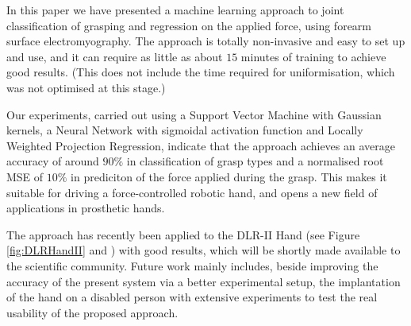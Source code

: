In this paper we have presented a machine learning approach to
joint classification of grasping and regression on the applied force,
using forearm surface electromyography. The approach is totally
non-invasive and easy to set up and use, and it can require as little
as about $15$ minutes of training to achieve good results. (This does
not include the time required for uniformisation, which was not
optimised at this stage.)

Our experiments, carried out using a Support Vector Machine with
Gaussian kernels, a Neural Network with sigmoidal activation
function and Locally Weighted Projection Regression, indicate that
the approach achieves an average accuracy of around $90\%$ in
classification of grasp types and a normalised root MSE of $10\%$
in prediciton of the force applied during the grasp. This makes it
suitable for driving a force-controlled robotic hand, and opens a
new field of applications in prosthetic hands.

The approach has recently been applied to the DLR-II Hand (see Figure
\ref{fig:DLRHandII} and \cite{ButFisGre2004}) with good results, which will be
shortly made available to the scientific community. Future work mainly
includes, beside improving the accuracy of the present system via a
better experimental setup, the implantation of the hand on a disabled
person with extensive experiments to test the real usability of the
proposed approach.
